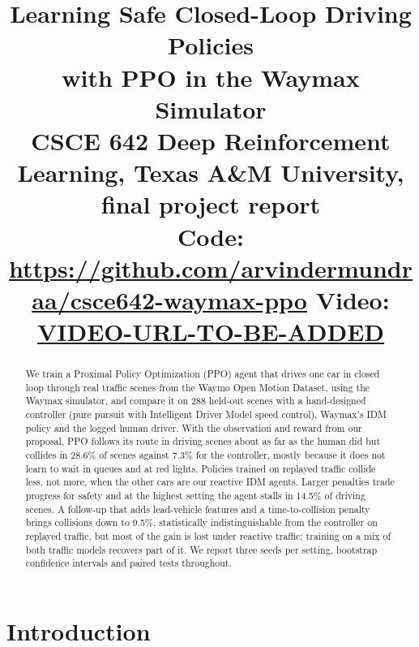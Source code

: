 \documentclass[conference]{IEEEtran}
\newcommand{\repourl}{https://github.com/arvindermundraa/csce642-waymax-ppo}
\newcommand{\videourl}{VIDEO-URL-TO-BE-ADDED}
\begin{document}
\title{Learning Safe Closed-Loop Driving Policies\\ with PPO in the Waymax Simulator\\[6pt]
{\normalsize CSCE 642 Deep Reinforcement Learning, Texas A\&M University, final project report\\[2pt]
\textbf{Code:} \url{\repourl} \qquad \textbf{Video:} \url{\videourl}}}

\author{
\and
{}
}

\maketitle

\begin{abstract}
We train a Proximal Policy Optimization (PPO) agent that drives one car in closed loop
through real traffic scenes from the Waymo Open Motion Dataset, using the Waymax simulator,
and compare it on 288 held-out scenes with a hand-designed controller (pure pursuit with
Intelligent Driver Model speed control), Waymax's IDM policy and the logged human driver.
With the observation and reward from our proposal, PPO follows its route in driving scenes about as far as the human did but collides in 28.6\% of scenes against 7.3\% for the controller, mostly
because it does not learn to wait in queues and at red lights. Policies trained on replayed traffic collide less, not more, when the other cars are our reactive IDM agents. Larger
penalties trade progress for safety and at the highest setting the agent stalls in
14.5\% of driving scenes. A follow-up that adds lead-vehicle features and a
time-to-collision penalty brings collisions down to 9.5\%, statistically
indistinguishable from the controller on replayed traffic, but most of the gain is lost
under reactive traffic; training on a mix of both traffic models recovers part of it. We report three seeds per setting, bootstrap confidence
intervals and paired tests throughout.
\end{abstract}

\section{Introduction}
\end{document}
